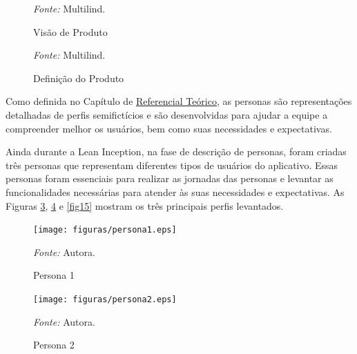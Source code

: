 \begin{figure}[h!]
	\centering
	\caption{Visão de Produto}
	\begin{tablenotes}[flushleft]
		\centering
		\item \textit{Fonte:} Multilind.
	\end{tablenotes}
	\label{fig11}
\end{figure}

\begin{figure}[h!]
	\centering
	\caption{Definição do Produto}
	\begin{tablenotes}[flushleft]
		\centering
		\item \textit{Fonte:} Multilind.
	\end{tablenotes}
	\label{fig12}
\end{figure}

Como definida no Capítulo de \hyperref[chap:Referencial]{Referencial Teórico}, as personas são representações detalhadas de perfis semifictícios e são desenvolvidas para ajudar a equipe a compreender melhor os usuários, bem como suas 
necessidades e expectativas. 

Ainda durante a Lean Inception, na fase de descrição de personas, foram criadas três personas que representam diferentes tipos de usuários do aplicativo. Essas personas foram essenciais para realizar as jornadas das personas e levantar as funcionalidades necessárias para atender às 
suas necessidades e expectativas. As Figuras \ref{fig13}, \ref{fig14} e \ref{fig15} mostram os três principais perfis levantados.

\begin{figure}[h!]
	\centering
	\caption{Persona 1}
	\begin{adjustbox}{center}
		\texttt{[image: figuras/persona1.eps]}
	\end{adjustbox}
	\begin{tablenotes}[flushleft]
		\centering
		\item \textit{Fonte:} Autora.
	\end{tablenotes}
	\label{fig13}
\end{figure}

\begin{figure}[h!]
	\centering
	\caption{Persona 2}
	\begin{adjustbox}{center}
		\texttt{[image: figuras/persona2.eps]}
	\end{adjustbox}
	\begin{tablenotes}[flushleft]
		\centering
		\item \textit{Fonte:} Autora.
	\end{tablenotes}
	\label{fig14}
\end{figure}

